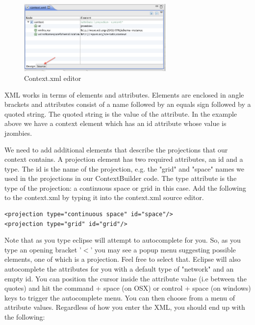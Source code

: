 \documentclass[11pt]{amsart}
\begin{document}
\begin{figure}[h]
\begin{center}
\vspace{.2in}
\centerline {
\includegraphics[width=3in]{GettingStartedImages/cedit.png}
}
\caption{Context.xml editor}
\label{fig:cedit}
\end{center}
\end{figure}

XML works in terms of elements and attributes. Elements are enclosed in angle brackets and attributes consist of a name followed by an equals sign followed by a quoted string. The quoted string is the value of the attribute. In the example above we have a context element which has an id attribute whose value is jzombies. 

We need to add additional elements that describe the projections that our context contains.  A projection element has two required attributes, an id and a type. The id is the name of the projection, e.g. the "grid" and "space" names we used in the projections in our ContextBuilder code. The type attribute is the type of the projection: a continuous space or grid in this case. Add the following to the context.xml by typing it into the context.xml source editor.

\noindent\begin{minipage}[h]{\textwidth}
\vspace{.2in}
\lstset{language=java,caption=JZombiesBuilder.build Complete }
\begin{lstlisting}
<projection type="continuous space" id="space"/>
<projection type="grid" id="grid"/>

\end{lstlisting}
\vspace{.2in}
\end{minipage}
Note that as you type eclipse will attempt to autocomplete for you. So, as you type an opening bracket '$<$' you may see a popup menu suggesting  possible elements, one of which is a projection. Feel free to select that. Eclipse will also autocomplete the attributes for you with a default type of "network" and an empty id. You can position the cursor inside the attribute value (i.e between the quotes) and hit the command + space (on OSX) or control + space (on windows) keys to trigger the autocomplete menu. You can then choose from a menu of attribute values. Regardless of how you enter the XML, you should end up with the following:
\end{document}
